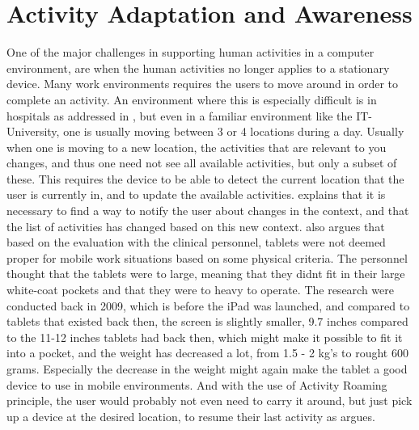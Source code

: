 \section{Activity Adaptation and Awareness}
One of the major challenges in supporting human activities in a computer environment, are when the human activities no longer applies to a stationary device. Many work environments requires the users to move around in order to complete an activity. An environment where this is especially difficult is in hospitals as addressed in \citet{bardram2009}, but even in a familiar environment like the IT-University, one is usually moving between 3 or 4 locations during a day. Usually when one is moving to a new location, the activities that are relevant to you changes, and thus one need not see all available activities, but only a subset of these. This requires the device to be able to detect the current location that the user is currently in, and to update the available activities. \citet{bardram2009} explains that it is necessary to find a way to notify the user about changes in the context, and that the list of activities has changed based on this new context. \citet{bardram2009} also argues that based on the evaluation with the clinical personnel, tablets were not deemed proper for mobile work situations based on some physical criteria. The personnel thought that the tablets were to large, meaning that they didnt fit in their large white-coat pockets and that they were to heavy to operate. The research were conducted back in 2009, which is before the iPad was launched, and compared to tablets that existed back then, the screen is slightly smaller, 9.7 inches compared to the 11-12 inches tablets had back then, which might make it possible to fit it into a pocket, and the weight has decreased a lot, from 1.5 - 2 kg's to rought 600 grams. Especially the decrease in the weight might again make the tablet a good device to use in mobile environments. And with the use of Activity Roaming principle, the user would probably not even need to carry it around, but just pick up a device at the desired location, to resume their last activity as \citet{bardram2009} argues.
\par\vspace{\baselineskip}
